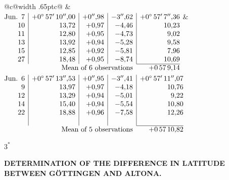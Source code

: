 \noindent\begin{tabular}{@{}c@{\hspace{.4em}\vrule width .65pt\hspace{.4em}}c@{}}
 &
 \\[.18ex]
\(\begin{array}[t]{@{}r|r|r|r|r@{}}
\text{Jun.}\enspace 7 & +0^\circ\,57'\,10''{,}00 & +0''{,}98 & -3''{,}62 & +0^\circ\,57'\,7''{,}36\\
10 & 13{,}72 & +0{,}97 & -4{,}46 & 10{,}23\\
11 & 12{,}80 & +0{,}95 & -4{,}73 & 9{,}02\\
13 & 13{,}92 & +0{,}94 & -5{,}28 & 9{,}58\\
15 & 12{,}85 & +0{,}92 & -5{,}81 & 7{,}96\\
27 & 18{,}48 & +0{,}95 & -8{,}74 & 10{,}69\\
\cline{5-5}
\multicolumn{4}{r}{\text{Mean of 6 observations}} & +0\,57\,9{,}14
\end{array}\)
&
\(\begin{array}[t]{@{}r|r|r|r|r@{}}
\text{Jun.}\enspace 6 & +0^\circ\,57'\,13''{,}53 & +0''{,}95 & -3''{,}41 & +0^\circ\,57'\,11''{,}07\\
9 & 13{,}97 & +0{,}97 & -4{,}18 & 10{,}76\\
12 & 13{,}29 & +0{,}94 & -5{,}01 & 9{,}22\\
14 & 15{,}40 & +0{,}94 & -5{,}54 & 10{,}80\\
22 & 18{,}88 & +0{,}96 & -7{,}58 & 12{,}26\\
 & & & & \\
\cline{5-5}
\multicolumn{4}{r}{\text{Mean of 5 observations}} & +0\,57\,10{,}82
\end{array}\)
\end{tabular}\par\medskip
\noindent\hfill \(3^{*}\)\hspace{.12\textwidth}\par

\par\clearpage
\noindent{}\parbox[t]{\dimexpr\linewidth-24mm\relax}{\centering\scriptsize\bfseries DETERMINATION OF THE DIFFERENCE IN LATITUDE BETWEEN GÖTTINGEN AND ALTONA.}\makebox[12mm][r]{}\par\medskip

